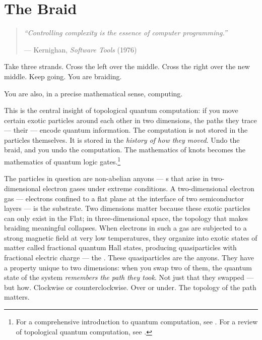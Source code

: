 
\chapter{The Braid}
\label{pos10:the-braid}

\begin{quote}\small\textit{%
``Controlling complexity is the essence of computer programming.''%
}\par\raggedleft --- Kernighan, \textit{Software Tools} (1976)\end{quote}

\vspace{0.5cm}


Take three strands. Cross the left over the middle. Cross the right over the new middle. Keep going. You are braiding.

You are also, in a precise mathematical sense, computing.

This is the central insight of topological quantum computation: if you move certain exotic particles around each other in two dimensions, the paths they trace --- their  --- encode quantum information. The computation is not stored in the particles themselves. It is stored in the \textit{history of how they moved}. Undo the braid, and you undo the computation. The mathematics of knots becomes the mathematics of quantum logic gates.\footnote{For a comprehensive introduction to quantum computation, see \cite{nielsen2000}. For a review of topological quantum computation, see \cite{nayak2008}.}

The particles in question are non-abelian \glspl{anyon} --- s that arise in two-dimensional electron gases under extreme conditions. A two-dimensional electron gas --- electrons confined to a flat plane at the interface of two semiconductor layers --- is the substrate. Two dimensions matter because these exotic particles can only exist in the Flat; in three-dimensional space, the topology that makes braiding meaningful collapses. When electrons in such a gas are subjected to a strong magnetic field at very low temperatures, they organize into exotic states of matter called fractional quantum Hall states, producing quasiparticles with fractional electric charge --- the . These quasiparticles are the anyons. They have a property unique to two dimensions: when you swap two of them, the quantum state of the system \textit{remembers the path they took}. Not just that they swapped --- but how. Clockwise or counterclockwise. Over or under. The topology of the path matters.

